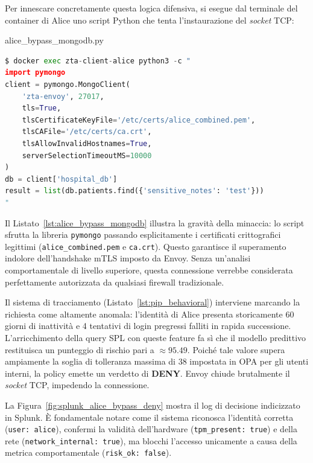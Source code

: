 Per innescare concretamente questa logica difensiva, si esegue dal terminale del container di Alice uno script Python che tenta l'instaurazione del \textit{socket} TCP:

\begin{center}
\begin{minipage}{\linewidth}
\begin{ztacodebox}{alice\_bypass\_mongodb.py}
\begin{lstlisting}[language=Python]
$ docker exec zta-client-alice python3 -c "
import pymongo
client = pymongo.MongoClient(
    'zta-envoy', 27017,
    tls=True,
    tlsCertificateKeyFile='/etc/certs/alice_combined.pem',
    tlsCAFile='/etc/certs/ca.crt',
    tlsAllowInvalidHostnames=True,
    serverSelectionTimeoutMS=10000
)
db = client['hospital_db']
result = list(db.patients.find({'sensitive_notes': 'test'}))
"
\end{lstlisting}
\end{ztacodebox}
\label{lst:alice_bypass_mongodb}
\end{minipage}
\end{center}

Il Listato~\ref{lst:alice_bypass_mongodb} illustra la gravità della minaccia: lo script sfrutta la libreria \texttt{pymongo} passando esplicitamente i certificati crittografici legittimi (\texttt{alice\_combined.pem} e \texttt{ca.crt}). Questo garantisce il superamento indolore dell'handshake mTLS imposto da Envoy. Senza un'analisi comportamentale di livello superiore, questa connessione verrebbe considerata perfettamente autorizzata da qualsiasi firewall tradizionale.

Il sistema di tracciamento (Listato~\ref{lst:pip_behavioral}) interviene marcando la richiesta come altamente anomala: l'identità di Alice presenta storicamente 60 giorni di inattività e 4 tentativi di login pregressi falliti in rapida successione. L'arricchimento della query SPL con queste feature fa sì che il modello predittivo restituisca un punteggio di rischio pari a $\approx 95.49$. Poiché tale valore supera ampiamente la soglia di tolleranza massima di $38$ impostata in OPA per gli utenti interni, la policy emette un verdetto di \textbf{DENY}. Envoy chiude brutalmente il \textit{socket} TCP, impedendo la connessione.

La Figura~\ref{fig:splunk_alice_bypass_deny} mostra il log di decisione indicizzato in Splunk. È fondamentale notare come il sistema riconosca l'identità corretta (\texttt{user: alice}), confermi la validità dell'hardware (\texttt{tpm\_present: true}) e della rete (\texttt{network\_internal: true}), ma blocchi l'accesso unicamente a causa della metrica comportamentale (\texttt{risk\_ok: false}).

